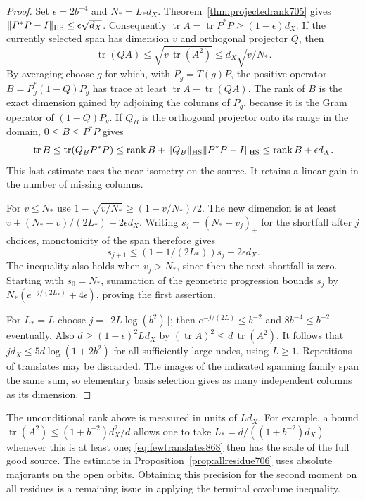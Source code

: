 \documentclass[a4paper,11pt]{article}
\theoremstyle{definition}
\theoremstyle{remark}
\numberwithin{equation}{section}
\begin{document}
\begin{proof}
Set \(\epsilon=2b^{-4}\) and \(N_*=L_*d_X\).
Theorem~\ref{thm:projectedrank705} gives
\(\|P^*P-I\|_{\rm HS}\le\epsilon\sqrt{d_X}\). Consequently
\(\operatorname{tr}A=\operatorname{tr}P^*P
\ge(1-\epsilon)d_X\). If the currently selected span has
dimension \(v\) and orthogonal projector \(Q\), then
\[
 \operatorname{tr}(QA)\le\sqrt{v\,\operatorname{tr}(A^2)}
                        \le d_X\sqrt{v/N_*}.
\]
By averaging choose \(g\) for which, with \(P_g=T(g)P\),
the positive operator \(B=P_g^*(1-Q)P_g\) has trace at
least \(\operatorname{tr}A-\operatorname{tr}(QA)\).
The rank of \(B\) is the exact dimension gained by adjoining
the columns of \(P_g\), because it is the Gram operator of
\((1-Q)P_g\). If \(Q_B\) is the orthogonal projector onto
its range in the domain, \(0\le B\le P^*P\) gives
\[
 \operatorname{tr}B\le\operatorname{tr}(Q_BP^*P)
       \le\operatorname{rank}B+
             \|Q_B\|_{\rm HS}\|P^*P-I\|_{\rm HS}
       \le\operatorname{rank}B+\epsilon d_X.
\]
This last estimate uses the near-isometry on the source.
It retains a linear gain in the number of missing columns.

For \(v\le N_*\) use \(1-\sqrt{v/N_*}\ge(1-v/N_*)/2\).
The new dimension is at least
\(v+(N_*-v)/(2L_*)-2\epsilon d_X\).
Writing \(s_j=(N_*-v_j)_+\) for the shortfall after \(j\)
choices, monotonicity of the span therefore gives
\[
 s_{j+1}\le(1-1/(2L_*))s_j+2\epsilon d_X.
\]
The inequality also holds when \(v_j>N_*\), since then the
next shortfall is zero. Starting with \(s_0=N_*\), summation
of the geometric progression bounds \(s_j\) by
\(N_*(e^{-j/(2L_*)}+4\epsilon)\), proving the first assertion.

For \(L_*=L\) choose \(j=\lceil2L\log(b^2)\rceil\); then
\(e^{-j/(2L)}\le b^{-2}\) and \(8b^{-4}\le b^{-2}\) eventually.
Also \(d\ge(1-\epsilon)^2 L d_X\) by
\((\operatorname{tr}A)^2\le d\,\operatorname{tr}(A^2)\).
It follows that \(j d_X\le5d\log(1+2b^2)\) for all
sufficiently large nodes, using \(L\ge1\). Repetitions of
translates may be discarded. The images of the indicated
spanning family span the same sum, so elementary basis
selection gives as many independent columns as its dimension.
\end{proof}

The unconditional rank above is measured in units of \(Ld_X\).
For example, a bound
\(\operatorname{tr}(A^2)\le(1+b^{-2})d_X^2/d\)
allows one to take \(L_*=d/((1+b^{-2})d_X)\) whenever this is
at least one; \eqref{eq:fewtranslates868} then has the scale of
the full good source. The estimate in
Proposition~\ref{prop:allresidue706} uses absolute majorants on
the open orbits. Obtaining this precision for the second moment
on all residues is a remaining issue in applying the terminal
covolume inequality.
\clearpage
\end{document}
